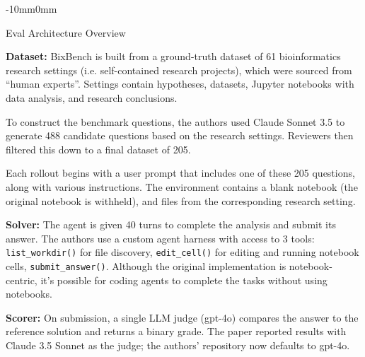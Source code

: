 \begin{maincontentstyled}
\begin{adjustwidth}{-10mm}{0mm}
\begin{dsbox}[breakable, title after break={EVAL ARCHITECTURE OVERVIEW CONT.}]{Eval Architecture Overview}
\begin{center}
\end{center}
\smallskip
\noindent\textbf{Dataset:} BixBench is built from a ground-truth dataset of 61 bioinformatics research settings (i.e. self-contained research projects), which were sourced from “human experts”. Settings contain hypotheses, datasets, Jupyter notebooks with data analysis, and research conclusions.

To construct the benchmark questions, the authors used Claude Sonnet 3.5 to generate 488 candidate questions based on the research settings. Reviewers then filtered this down to a final dataset of 205.

Each rollout begins with a user prompt that includes one of these 205 questions, along with various instructions. The environment contains a blank notebook (the original notebook is withheld), and files from the corresponding research setting.\par\smallskip
\noindent\textbf{Solver:} The agent is given 40 turns to complete the analysis and submit its answer. The authors use a custom agent harness with access to 3 tools:
\texttt{list\_workdir()}  for file discovery, \texttt{edit\_cell()} for editing and running notebook cells, \texttt{submit_answer()}.
Although the original implementation is notebook-centric, it’s possible for coding agents to complete the tasks without using notebooks. \par\smallskip
\noindent\textbf{Scorer:} On submission, a single LLM judge (gpt-4o) compares the answer to the reference solution and returns a binary grade. The paper reported results with Claude 3.5 Sonnet as the judge; the authors' repository now defaults to gpt-4o.
\end{dsbox}


\end{adjustwidth}
\end{maincontentstyled}
